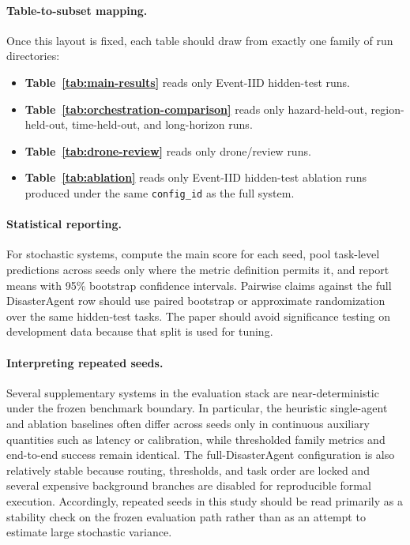 \documentclass{article}
\begin{document}
\paragraph{Table-to-subset mapping.}
Once this layout is fixed, each table should draw from exactly one family of run directories:
\begin{itemize}[leftmargin=1.2em]
    \item \textbf{Table~\ref{tab:main-results}} reads only Event-IID hidden-test runs.
    \item \textbf{Table~\ref{tab:orchestration-comparison}} reads only hazard-held-out, region-held-out, time-held-out, and long-horizon runs.
    \item \textbf{Table~\ref{tab:drone-review}} reads only drone/review runs.
    \item \textbf{Table~\ref{tab:ablation}} reads only Event-IID hidden-test ablation runs produced under the same \texttt{config\_id} as the full system.
\end{itemize}

\paragraph{Statistical reporting.}
For stochastic systems, compute the main score for each seed, pool task-level predictions across seeds only where the metric definition permits it, and report means with 95\% bootstrap confidence intervals. Pairwise claims against the full DisasterAgent row should use paired bootstrap or approximate randomization over the same hidden-test tasks. The paper should avoid significance testing on development data because that split is used for tuning.

\paragraph{Interpreting repeated seeds.}
Several supplementary systems in the evaluation stack are near-deterministic under the frozen benchmark boundary. In particular, the heuristic single-agent and ablation baselines often differ across seeds only in continuous auxiliary quantities such as latency or calibration, while thresholded family metrics and end-to-end success remain identical. The full-DisasterAgent configuration is also relatively stable because routing, thresholds, and task order are locked and several expensive background branches are disabled for reproducible formal execution. Accordingly, repeated seeds in this study should be read primarily as a stability check on the frozen evaluation path rather than as an attempt to estimate large stochastic variance.
\end{document}
